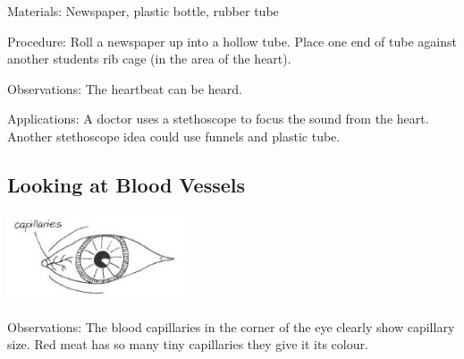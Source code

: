 \begin{multicols}{2}
\begin{description*}
\item[Materials:]{Newspaper, plastic bottle, rubber tube}
\item[Procedure:]{Roll a newspaper up into a hollow tube. Place one end of tube against another students rib
cage (in the area of the heart).}
\item[Observations:]{The heartbeat can be heard.}
\item[Applications:]{A doctor uses a stethoscope to focus the sound from the heart. Another stethoscope idea
could use funnels and plastic tube.}
\end{description*}

\subsection{Looking at Blood Vessels} %

\begin{center}
\includegraphics[width=0.4\textwidth]{./img/vso/blood-vessels-ex.jpg}
\end{center}

\begin{description*}
\item[Observations:]{The blood capillaries in the corner
of the eye clearly show capillary
size. Red meat has so many tiny
capillaries they give it its colour.}
\end{description*}


\end{multicols}
